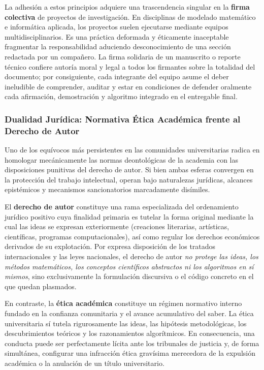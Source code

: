 La adhesión a estos principios adquiere una trascendencia singular en la \textbf{firma colectiva} de proyectos de investigación. En disciplinas de modelado matemático e informática aplicada, los proyectos suelen ejecutarse mediante equipos multidisciplinarios. Es una práctica deformada y éticamente inaceptable fragmentar la responsabilidad aduciendo desconocimiento de una sección redactada por un compañero. La firma solidaria de un manuscrito o reporte técnico confiere autoría moral y legal a todos los firmantes sobre la totalidad del documento; por consiguiente, cada integrante del equipo asume el deber ineludible de comprender, auditar y estar en condiciones de defender oralmente cada afirmación, demostración y algoritmo integrado en el entregable final.

\subsubsection{Dualidad Jurídica: Normativa Ética Académica frente al Derecho de Autor}

Uno de los equívocos más persistentes en las comunidades universitarias radica en homologar mecánicamente las normas deontológicas de la academia con las disposiciones punitivas del derecho de autor. Si bien ambas esferas convergen en la protección del trabajo intelectual, operan bajo naturalezas jurídicas, alcances epistémicos y mecanismos sancionatorios marcadamente disímiles.

El \textbf{derecho de autor} constituye una rama especializada del ordenamiento jurídico positivo cuya finalidad primaria es tutelar la forma original mediante la cual las ideas se expresan exteriormente (creaciones literarias, artísticas, científicas, programas computacionales), así como regular los derechos económicos derivados de su explotación. Por expresa disposición de los tratados internacionales y las leyes nacionales, el derecho de autor \textit{no protege las ideas, los métodos matemáticos, los conceptos científicos abstractos ni los algoritmos en sí mismos}, sino exclusivamente la formulación discursiva o el código concreto en el que quedan plasmados.

En contraste, la \textbf{ética académica} constituye un régimen normativo interno fundado en la confianza comunitaria y el avance acumulativo del saber. La ética universitaria sí tutela rigurosamente las ideas, las hipótesis metodológicas, los descubrimientos teóricos y los razonamientos algorítmicos. En consecuencia, una conducta puede ser perfectamente lícita ante los tribunales de justicia y, de forma simultánea, configurar una infracción ética gravísima merecedora de la expulsión académica o la anulación de un título universitario.


